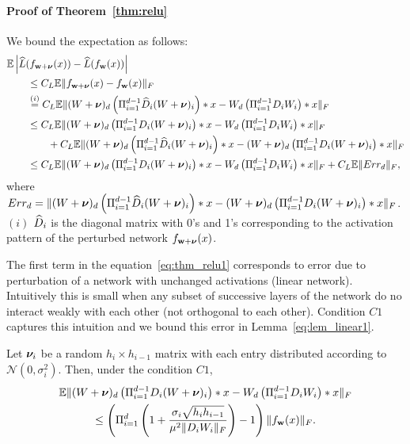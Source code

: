 \documentclass{article}
\begin{document}
\paragraph{Proof of Theorem~\ref{thm:relu}}
We bound the expectation as follows:
\begin{align}
&\mathbb{E} \left\lvert{ \widehat{L}(f_{\mathbf{w}+\boldsymbol{\nu}}(x)) -\widehat{L}(f_{\mathbf{w}}(x))}\right\rvert \nonumber \\ 
&\quad \quad  \leq C_{L} \mathbb{E} \| f_{\mathbf{w}+\boldsymbol{\nu}}(x) -f_{\mathbf{w}}(x)\|_F \nonumber \\
&\quad \quad \stackrel{(i)}{=}  C_{L}\mathbb{E} \| (W+\boldsymbol{\nu})_d \left(\Pi_{i=1}^{d-1} \widehat{D}_{i} (W+\boldsymbol{\nu})_i \right)*x - W_d \left(\Pi_{i=1}^{d-1} D_{i}W_i \right)*x \|_F  \nonumber \\
& \quad \quad \leq  C_{L} \mathbb{E} \| (W+\boldsymbol{\nu})_d \left(\Pi_{i=1}^{d-1} D_{i} (W+\boldsymbol{\nu})_i \right)*x - W_d \left(\Pi_{i=1}^{d-1} D_{i}W_i \right)*x \|_F \nonumber \\ & \quad \quad \quad \quad + C_{L} \mathbb{E} \| (W+\boldsymbol{\nu})_d \left(\Pi_{i=1}^{d-1} \widehat{D}_{i} (W+\boldsymbol{\nu})_i \right)*x - (W+\boldsymbol{\nu})_d \left(\Pi_{i=1}^{d-1} D_{i} (W+\boldsymbol{\nu})_i \right)*x \|_F \nonumber \\
&\quad \quad \leq  C_{L} \mathbb{E} \| (W+\boldsymbol{\nu})_d \left(\Pi_{i=1}^{d-1} D_{i} (W+\boldsymbol{\nu})_i \right)*x - W_d \left(\Pi_{i=1}^{d-1} D_{i}W_i \right)*x \|_F +C_{L} \mathbb{E} \|Err_d\|_F,  \label{eq:thm_relu1}
\end{align}
where $Err_d =  \| (W+\boldsymbol{\nu})_d \left(\Pi_{i=1}^{d-1} \widehat{D}_{i} (W+\boldsymbol{\nu})_i \right)*x - (W+\boldsymbol{\nu})_d \left(\Pi_{i=1}^{d-1} D_{i} (W+\boldsymbol{\nu})_i \right)*x \|_F$. $(i)$ $\widehat{D}_i$ is the diagonal matrix with 0's and 1's corresponding to the activation pattern of the perturbed network $f_{\mathbf{w}+\boldsymbol{\nu}}(x)$.

The first term in the equation~\eqref{eq:thm_relu1} corresponds to error due to perturbation of a network with unchanged activations (linear network). Intuitively this is small when any subset of successive layers of the network do no interact weakly with each other (not orthogonal to each other). Condition $C1$ captures this intuition and we bound this error in Lemma~\ref{eq:lem_linear1}. 

\begin{lem}\label{lem:linear}
Let $\boldsymbol{\nu}_i$ be a random $h_i \times h_{i-1}$ matrix with each entry distributed according to $\mathcal{N}(0,\sigma_i^2)$. Then, under the condition $C1$,
\begin{multline*}
\mathbb{E} \| (W+\boldsymbol{\nu})_d \left(\Pi_{i=1}^{d-1} D_{i}(W+\boldsymbol{\nu})_i \right)*x - W_d \left(\Pi_{i=1}^{d-1} D_{i}W_i \right)*x\|_F \\ \leq  \left(\Pi_{i=1}^d \left(1+ \frac{\sigma_i \sqrt{h_ih_{i-1}}}{\mu^2 \|D_i W_i\|_F} \right) -1 \right)   \|f_{\mathbf{w}}(x)\|_F. 
\end{multline*}
\end{lem}
\end{document}
